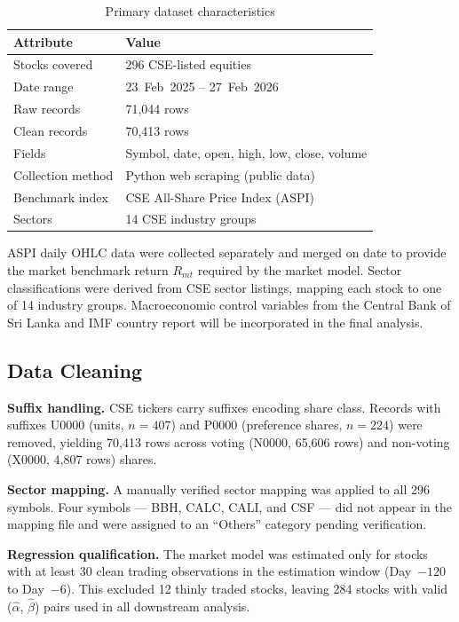 \documentclass[sigconf, nonacm]{acmart}
\begin{document}
\begin{table}[h]
  \centering
  \caption{Primary dataset characteristics}
  \label{tab:dataset}
  \small
  \begin{tabular}{@{}ll@{}}
    \toprule
    \textbf{Attribute} & \textbf{Value} \\
    \midrule
    Stocks covered & 296 CSE-listed equities \\
    Date range  & 23~Feb~2025 -- 27~Feb~2026 \\
    Raw records & 71,044 rows \\
    Clean records & 70,413 rows \\
    Fields      & Symbol, date, open, high, low, close, volume \\
    Collection method & Python web scraping (public data) \\
    Benchmark index & CSE All-Share Price Index (ASPI) \\
    Sectors     & 14 CSE industry groups \\
    \bottomrule
  \end{tabular}
\end{table}

ASPI daily OHLC data were collected separately and merged on date to provide the market benchmark return $R_{mt}$ required by the market model. Sector classifications were derived from CSE sector listings, mapping each stock to one of 14 industry groups. Macroeconomic control variables from the Central Bank of Sri Lanka and IMF country report \cite{imf2025} will be incorporated in the final analysis.

\subsection{Data Cleaning}

\textbf{Suffix handling.} CSE tickers carry suffixes encoding share class. Records with suffixes U0000 (units, $n=407$) and P0000 (preference shares, $n=224$) were removed, yielding 70,413 rows across voting (N0000, 65,606 rows) and non-voting (X0000, 4,807 rows) shares.

\textbf{Sector mapping.} A manually verified sector mapping was applied to all 296 symbols. Four symbols --- BBH, CALC, CALI, and CSF --- did not appear in the mapping file and were assigned to an ``Others'' category pending verification.

\textbf{Regression qualification.} The market model was estimated only for stocks with at least 30 clean trading observations in the estimation window (Day~$-120$ to Day~$-6$). This excluded 12 thinly traded stocks, leaving 284 stocks with valid ($\hat{\alpha}$, $\hat{\beta}$) pairs used in all downstream analysis.
\end{document}
